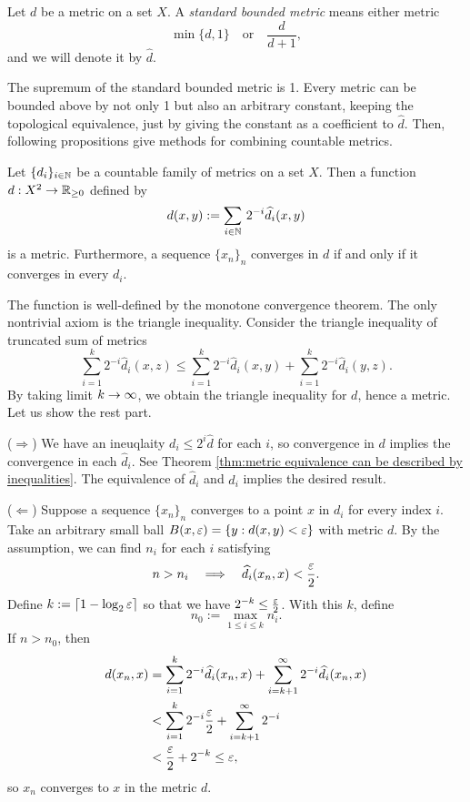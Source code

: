 \begin{defn}
Let $d$ be a metric on a set $X$.
A \emph{standard bounded metric} means either metric
\[\min\{d,1\}\quad\text{or}\quad\frac d{d+1},\]
and we will denote it by $\hat d$.
\end{defn}

The supremum of the standard bounded metric is 1.
Every metric can be bounded above by not only 1 but also an arbitrary constant, keeping the topological equivalence, just by giving the constant as a coefficient to $\hat d$.
Then, following propositions give methods for combining countable metrics.

\begin{prop}
Let $\{d_i\}_{i\in\mathbb{N}}$ be a countable family of metrics on a set $X$.
Then a function $d:X^2\to\R_{\ge0}$ defined by
\[d(x,y):=\sum_{i\in\mathbb{N}}\,2^{-i}\widehat d_i(x,y)\]
is a metric.
Furthermore, a sequence $\{x_n\}_n$ converges in $d$ if and only if it converges in every $d_i$.
\end{prop}
\begin{pf}
The function is well-defined by the monotone convergence theorem.
The only nontrivial axiom is the triangle inequality.
Consider the triangle inequality of truncated sum of metrics
\[\sum_{i=1}^k2^{-i}\hat d_i(x,z)\le\sum_{i=1}^k2^{-i}\hat d_i(x,y)+\sum_{i=1}^k2^{-i}\hat d_i(y,z).\]
By taking limit $k\to\oo$, we obtain the triangle inequality for $d$, hence a metric.
Let us show the rest part.

($\Rightarrow$)
We have an ineuqlaity $d_i\le2^i\hat d$ for each $i$, so convergence in $d$ implies the convergence in each $\hat d_i$.
See Theorem \ref{thm:metric equivalence can be described by inequalities}.
The equivalence of $\hat d_i$ and $d_i$ implies the desired result.

($\Leftarrow$)
Suppose a sequence $\{x_n\}_n$ converges to a point $x$ in $d_i$ for every index $i$.
Take an arbitrary small ball $B(x,\varepsilon)=\{y:d(x,y)<\varepsilon\}$ with metric $d$.
By the assumption, we can find $n_i$ for each $i$ satisfying
\[n>n_i\impl\hat d_i(x_n,x)<\frac\e2.\]
Define $k:=\lceil1-\log_2\varepsilon\rceil$ so that we have $2^{-k}\le\frac{\varepsilon}2$.
With this $k$, define
\[n_0:=\max_{1\le i\le k}n_i.\]
If $n>n_0$, then
\begin{align*}
d(x_n,x)&=\sum_{i=1}^k2^{-i}\widehat d_i(x_n,x)+\sum_{i=k+1}^\infty2^{-i}\widehat d_i(x_n,x)\\
&<\sum_{i=1}^k2^{-i}\frac{\varepsilon}2+\sum_{i=k+1}^\infty2^{-i}\\
&<\frac{\varepsilon}2+2^{-k}\le\varepsilon,
\end{align*}
so $x_n$ converges to $x$ in the metric $d$.
\end{pf}
